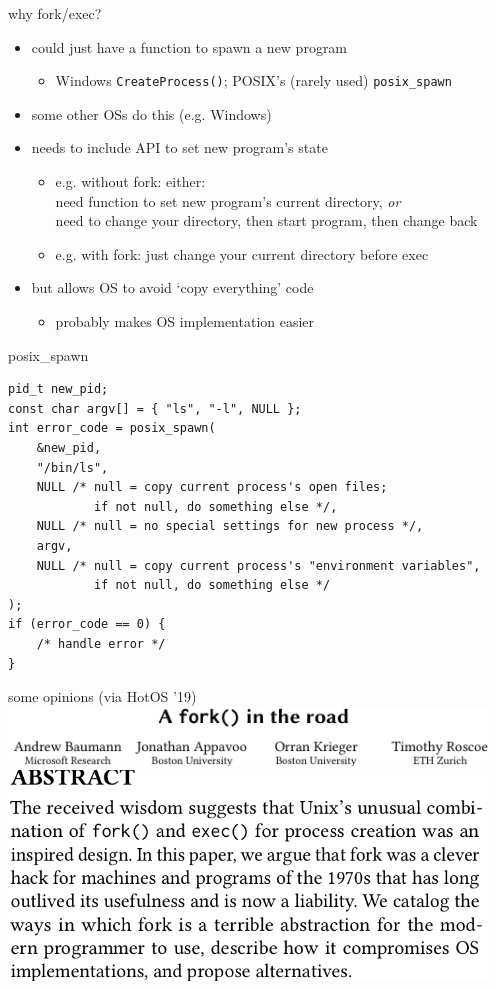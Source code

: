 \begin{frame}{why fork/exec?}
    \begin{itemize}
    \item could just have a function to spawn a new program
        \begin{itemize}
        \item Windows \texttt{CreateProcess()}; POSIX's (rarely used) \texttt{posix\_spawn}
        \end{itemize}
    \vspace{.5cm}
    \item some other OSs do this (e.g. Windows)
    \item needs to include API to set new program's state
        \begin{itemize}
        \item e.g. without fork: either: \\
        need function to set new program's current directory, \textit{or} \\
        need to change your directory, then start program, then change back
        \item e.g. with fork: just change your current directory before exec
        \end{itemize}
    \item but allows OS to avoid `copy everything' code
        \begin{itemize}
        \item probably makes OS implementation easier
        \end{itemize}
    \end{itemize}
\end{frame}

\begin{frame}[fragile,label=posixSpawn]{posix\_spawn}
\begin{lstlisting}[style=small]
pid_t new_pid;
const char argv[] = { "ls", "-l", NULL };
int error_code = posix_spawn(
    &new_pid,
    "/bin/ls",
    NULL /* null = copy current process's open files;
            if not null, do something else */,
    NULL /* null = no special settings for new process */,
    argv,
    NULL /* null = copy current process's "environment variables", 
            if not null, do something else */
);
if (error_code == 0) {
    /* handle error */
}
\end{lstlisting}
\end{frame}

\begin{frame}{some opinions (via HotOS '19)}
\includegraphics[width=5in]{../unix-api/fork-in-road-title}
\includegraphics[width=5in]{../unix-api/fork-in-road-abs}
\end{frame}
